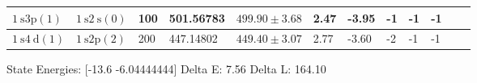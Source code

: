 \begin{adjustwidth}{-1cm}{-1cm}
\begin{adjustbox}{width=1.5\textwidth, center}
\begin{tabular}{|l|l|l|l|l|l|l|l|l|l|l|l|}
            \hline $1 \mathrm{~s} 3 \mathrm{p}(1)$  & $1 \mathrm{~s} 2 \mathrm{~s}(0)$ & 100                & 501.56783                                & $499.90 \pm 3.68$                & 2.47                         & -3.95                        & -1                 & -1                 & -1 \\
            \hline $1 \mathrm{~s} 4 \mathrm{~d}(1)$ & $1 \mathrm{~s} 2 \mathrm{p}(2)$  & 200                & 447.14802                                & $449.40 \pm 3.07$                & 2.77                         & -3.60                        & -2                 & -1                 & -1 \\
            \hline
        \end{tabular}

    \end{adjustbox}

\end{adjustwidth}



State Energies: [-13.6         -6.04444444]
Delta E: 7.56
Delta L: 164.10